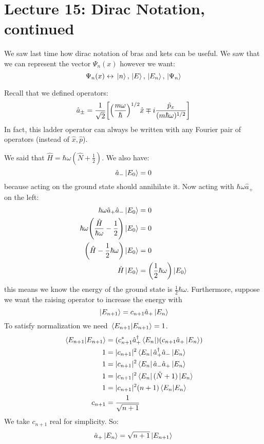 \section{Lecture 15: Dirac Notation, continued}

We saw last time how dirac notation of bras and kets can be useful. We saw that we can represent
the vector $\Psi_n(x)$ however we want:
\[ \Psi_n(x) \leftrightarrow \ket*{n}, \ket*{E}, \ket*{E_n}, \ket*{\Psi_n}\]

Recall that we defined operators:
\[ \hat{a}_{\pm} = \frac{1}{\sqrt{2}} \qty[\qty(\frac{m\omega}{\hbar})^{1/2} \hat{x} \mp i \frac{\hat{p}_x}{(m\hbar \omega)^{1/2}}] \]
In fact, this ladder operator can always be written with any Fourier pair of operators (instead of $\hat{x}, \hat{p}$).

We said that $\hat{H} = \hbar \omega(\hat{N} + \frac{1}{2})$. We also have:
\[ \hat{a}_{-} \ket*{E_0} = 0 \]
because acting on the ground state should annihilate it. Now acting with
$\hbar \omega \hat{a}_{+}$ on the left:
\begin{align*}
    \hbar \omega \hat{a}_{+} \hat{a}_{-} \ket*{E_0} &= 0 \\
    \hbar \omega \qty(\frac{\hat{H}}{\hbar\omega} - \frac{1}{2}) \ket*{E_0} &= 0\\
    \qty(\hat{H} - \frac{1}{2} \hbar \omega) \ket*{E_0} &= 0\\
    \hat{H} \ket*{E_0} &= \qty(\frac{1}{2} \hbar \omega) \ket*{E_0}
\end{align*}
this means we know the energy of the ground state is $\frac{1}{2}\hbar \omega$.
Furthermore, suppose we want the raising operator to increase the energy with 
\[ \ket*{E_{n + 1}} = c_{n + 1} \hat{a}_{+} \ket*{E_n} \]
To satisfy normalization we need $\bra{E_{n + 1}}\ket*{E_{n + 1}} = 1$.
\begin{align*}
    \bra{E_{n + 1}}\ket*{E_{n + 1}} &= (c^*_{n + 1} \hat{a}^{\dagger}_{+} \bra{E_n})(c_{n + 1} \hat{a}_{+}\ket*{E_n}) \\ 
    1 &= |c_{n + 1}|^2 \bra{E_n} \hat{a}_{+}^{\dagger} \hat{a}_{-} \ket*{E_n} \\
    1 &= |c_{n + 1}|^2 \bra{E_n} \hat{a}_{-} \hat{a}_{+} \ket*{E_n} \\
    1 &= |c_{n + 1}|^2 \bra{E_n} (\hat{N} + 1) \ket*{E_n} \\
    1 &= |c_{n + 1}|^2 (n + 1) \bra{E_n} \ket*{E_n} \\
    c_{n + 1} &= \frac{1}{\sqrt{n + 1}}
\end{align*}
We take $c_{n + 1}$ real for simplicity. So:
\[ \hat{a}_{+} \ket*{E_n} = \sqrt{n + 1} \ket*{E_{n + 1}} \]

